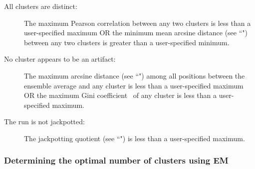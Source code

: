 \documentclass[11pt]{article}
\begin{document}
\begin{enumerate}
\begin{description}
        \item[All clusters are distinct:] The maximum Pearson correlation between any two clusters is less than a user-specified maximum OR the minimum mean arcsine distance (see ``") between any two clusters is greater than a user-specified minimum.
        \item[No cluster appears to be an artifact:] The maximum arcsine distance (see ``") among all positions between the ensemble average and any cluster is less than a user-specified maximum OR the maximum Gini coefficient~\cite{Rouskin2014} of any cluster is less than a user-specified maximum.
        \item[The run is not jackpotted:] The jackpotting quotient (see ``") is less than a user-specified maximum.
    \end{description}
\end{enumerate}

\subsubsection{Determining the optimal number of clusters using EM}
\label{em-optimal-k}
\end{document}
